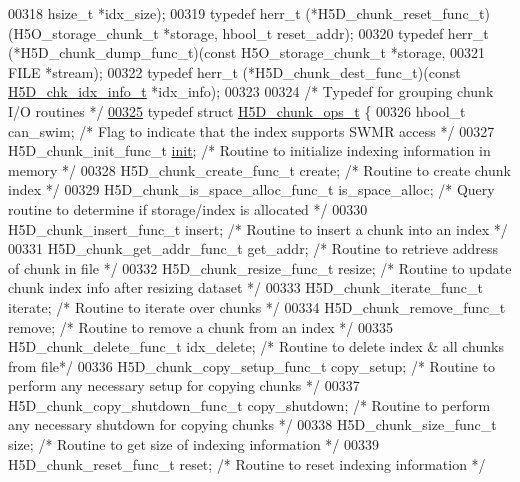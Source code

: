 \begin{DoxyCode}
00318     hsize\_t *idx\_size);
00319 \textcolor{keyword}{typedef} herr\_t (*H5D\_chunk\_reset\_func\_t)(H5O\_storage\_chunk\_t *storage, hbool\_t reset\_addr);
00320 \textcolor{keyword}{typedef} herr\_t (*H5D\_chunk\_dump\_func\_t)(\textcolor{keyword}{const} H5O\_storage\_chunk\_t *storage,
00321     FILE *stream);
00322 \textcolor{keyword}{typedef} herr\_t (*H5D\_chunk\_dest\_func\_t)(\textcolor{keyword}{const} \hyperlink{struct_h5_d__chk__idx__info__t}{H5D\_chk\_idx\_info\_t} *idx\_info);
00323 
00324 \textcolor{comment}{/* Typedef for grouping chunk I/O routines */}
\hyperlink{struct_h5_d__chunk__ops__t}{00325} \textcolor{keyword}{typedef} \textcolor{keyword}{struct }\hyperlink{struct_h5_d__chunk__ops__t}{H5D\_chunk\_ops\_t} \{
00326     hbool\_t can\_swim;                       \textcolor{comment}{/* Flag to indicate that the index supports SWMR access */}
00327     H5D\_chunk\_init\_func\_t \hyperlink{structinit}{init};             \textcolor{comment}{/* Routine to initialize indexing information in memory */}
00328     H5D\_chunk\_create\_func\_t create;         \textcolor{comment}{/* Routine to create chunk index */}
00329     H5D\_chunk\_is\_space\_alloc\_func\_t is\_space\_alloc;    \textcolor{comment}{/* Query routine to determine if storage/index is
       allocated */}
00330     H5D\_chunk\_insert\_func\_t insert;         \textcolor{comment}{/* Routine to insert a chunk into an index */}
00331     H5D\_chunk\_get\_addr\_func\_t get\_addr;     \textcolor{comment}{/* Routine to retrieve address of chunk in file */}
00332     H5D\_chunk\_resize\_func\_t resize;         \textcolor{comment}{/* Routine to update chunk index info after resizing dataset */}
00333     H5D\_chunk\_iterate\_func\_t iterate;       \textcolor{comment}{/* Routine to iterate over chunks */}
00334     H5D\_chunk\_remove\_func\_t \textcolor{keyword}{remove};         \textcolor{comment}{/* Routine to remove a chunk from an index */}
00335     H5D\_chunk\_delete\_func\_t idx\_delete;     \textcolor{comment}{/* Routine to delete index & all chunks from file*/}
00336     H5D\_chunk\_copy\_setup\_func\_t copy\_setup; \textcolor{comment}{/* Routine to perform any necessary setup for copying chunks */}
00337     H5D\_chunk\_copy\_shutdown\_func\_t copy\_shutdown; \textcolor{comment}{/* Routine to perform any necessary shutdown for copying
       chunks */}
00338     H5D\_chunk\_size\_func\_t size;             \textcolor{comment}{/* Routine to get size of indexing information */}
00339     H5D\_chunk\_reset\_func\_t reset;           \textcolor{comment}{/* Routine to reset indexing information */}

\end{DoxyCode}
